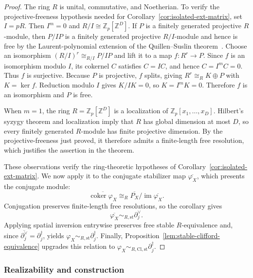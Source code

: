\documentclass[aps,prx,english,superscriptaddress,twocolumn,tightenlines,showpacs,longbibliography,floatfix,amsfonts]{revtex4-2}
\theoremstyle{remark}
\theoremstyle{definition}
\begin{document}
\begin{proof}
	The ring $R$ is unital, commutative, and Noetherian. To verify the projective-freeness hypothesis needed for Corollary~\ref{cor:isolated-ext-matrix}, set $I=pR$. Then $I^m=0$ and $R/I\cong\mathbb Z_p[\mathbb Z^D]$. If $P$ is a finitely generated projective $R$-module, then $P/IP$ is a finitely generated projective $R/I$-module and hence is free by the Laurent-polynomial extension of the Quillen--Suslin theorem~\cite{Swan1978}. Choose an isomorphism $(R/I)^r\cong_{R/I}P/IP$ and lift it to a map $f\colon R^r\to P$. Since $f$ is an isomorphism modulo $I$, its cokernel $C$ satisfies $C=IC$, and hence $C=I^mC=0$. Thus $f$ is surjective. Because $P$ is projective, $f$ splits, giving $R^r\cong_R K\oplus P$ with $K=\ker f$. Reduction modulo $I$ gives $K/IK=0$, so $K=I^mK=0$. Therefore $f$ is an isomorphism and $P$ is free.

	When $m=1$, the ring $R=\mathbb Z_p[\mathbb Z^D]$ is a localization of $\mathbb Z_p[x_1,\ldots,x_D]$. Hilbert's syzygy theorem and localization imply that $R$ has global dimension at most $D$, so every finitely generated $R$-module has finite projective dimension. By the projective-freeness just proved, it therefore admits a finite-length free resolution, which justifies the assertion in the theorem.

	These observations verify the ring-theoretic hypotheses of Corollary~\ref{cor:isolated-ext-matrix}. We now apply it to the conjugate stabilizer map $\overline{\varphi_X}$, which presents the conjugate module:
	\begin{equation}
		\overline{\operatorname{coker}\varphi_X}
		\cong_R
		\overline{P_X}/\operatorname{im}\overline{\varphi_X}.
	\end{equation}
	Conjugation preserves finite-length free resolutions, so the corollary gives
	\begin{equation}
		\overline{\varphi_X}\sim_{R,\mathrm{st}}\partial_j^\vee.
	\end{equation}
	Applying spatial inversion entrywise preserves free stable \(R\)-equivalence and, since $\overline{\partial_j^\vee}=\partial_j^\dagger$, yields $\varphi_X\sim_{R,\mathrm{st}}\partial_j^\dagger$. Finally, Proposition~\ref{lem:stable-clifford-equivalence} upgrades this relation to $\varphi_X\sim_{R,\mathrm{Cl},\mathrm{st}}\partial_j^\dagger$.
\end{proof}

\subsubsection{Realizability and construction}
\label{subsubsec:code-construction}
\end{document}
